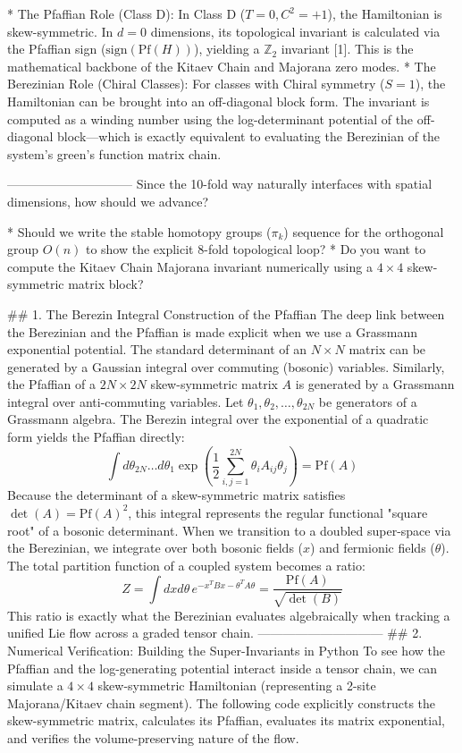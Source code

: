 * The Pfaffian Role (Class D): In Class D ($T=0, C^2=+1$), the Hamiltonian is skew-symmetric. In $d=0$ dimensions, its topological invariant is calculated via the Pfaffian sign ($\text{sign}(\text{Pf}(H))$), yielding a $\mathbb{Z}_2$ invariant [1]. This is the mathematical backbone of the Kitaev Chain and Majorana zero modes.
* The Berezinian Role (Chiral Classes): For classes with Chiral symmetry ($S=1$), the Hamiltonian can be brought into an off-diagonal block form. The invariant is computed as a winding number using the log-determinant potential of the off-diagonal block—which is exactly equivalent to evaluating the Berezinian of the system's green's function matrix chain.

------------------------------
Since the 10-fold way naturally interfaces with spatial dimensions, how should we advance?

* Should we write the stable homotopy groups ($\pi_k$) sequence for the orthogonal group $O(n)$ to show the explicit 8-fold topological loop?
* Do you want to compute the Kitaev Chain Majorana invariant numerically using a $4 \times 4$ skew-symmetric matrix block?


## 1. The Berezin Integral Construction of the Pfaffian
The deep link between the Berezinian and the Pfaffian is made explicit when we use a Grassmann exponential potential. The standard determinant of an $N \times N$ matrix can be generated by a Gaussian integral over commuting (bosonic) variables. Similarly, the Pfaffian of a $2N \times 2N$ skew-symmetric matrix $A$ is generated by a Grassmann integral over anti-commuting variables.
Let $\theta_1, \theta_2, \dots, \theta_{2N}$ be generators of a Grassmann algebra. The Berezin integral over the exponential of a quadratic form yields the Pfaffian directly:
$$\int d\theta_{2N} \dots d\theta_1 \exp\left( \frac{1}{2} \sum_{i,j=1}^{2N} \theta_i A_{ij} \theta_j \right) = \text{Pf}(A)$$ 
Because the determinant of a skew-symmetric matrix satisfies $\det(A) = \text{Pf}(A)^2$, this integral represents the regular functional "square root" of a bosonic determinant.
When we transition to a doubled super-space via the Berezinian, we integrate over both bosonic fields ($x$) and fermionic fields ($\theta$). The total partition function of a coupled system becomes a ratio:
$$Z = \int dx d\theta \, e^{-x^T B x - \theta^T A \theta} = \frac{\text{Pf}(A)}{\sqrt{\det(B)}}$$ 
This ratio is exactly what the Berezinian evaluates algebraically when tracking a unified Lie flow across a graded tensor chain.
------------------------------
## 2. Numerical Verification: Building the Super-Invariants in Python
To see how the Pfaffian and the log-generating potential interact inside a tensor chain, we can simulate a $4 \times 4$ skew-symmetric Hamiltonian (representing a 2-site Majorana/Kitaev chain segment).
The following code explicitly constructs the skew-symmetric matrix, calculates its Pfaffian, evaluates its matrix exponential, and verifies the volume-preserving nature of the flow.

